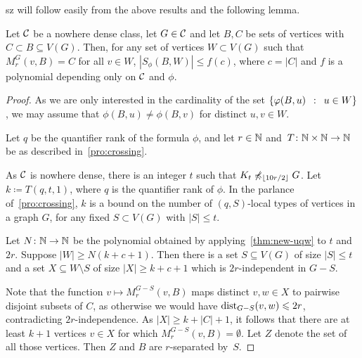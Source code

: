 \begin{change}{sz}
	 will follow easily from the above results and the following lemma.
\begin{lemma}\label{lem:num-types-same-class}
 Let $\mathcal{C}$ be a nowhere dense class,
let $G\in\mathcal{C}$ and let $B,C$ be sets of vertices with
$C\subset B\subseteq V(G)$.
Then, for any set of vertices $W\subset V(G)$ such that 
$M_r^G(v,B)=C$ for all $v\in W$, 
 $|S_\phi(B,W)|\le f(c)$, where $c=|C|$ and $f$ is a polynomial depending only on $\mathcal{C}$ and $\phi$.
\end{lemma}

\begin{proof}
As we are only interested in the cardinality of the set $\left\{\varphi(B,u) \,~:~\, u\in W \right\}$,
we may assume  that $\phi(B,u)\neq \phi(B,v)$ 
for distinct $u, v\in W$.


Let $q$ be the quantifier rank of the formula $\phi$,
and let $r\in \mathbb{N}$ and~$T\colon \mathbb{N}\times \mathbb{N}\to \mathbb{N}$  
be as described in~\cref{pro:crossing}.

As $\mathcal{C}$ is nowhere dense, there is an integer $t$ such that 
$K_t\not\preccurlyeq_{\lfloor 10r/2\rfloor} G$. 
Let $k\coloneqq T(q,t,1)$, where $q$ is the quantifier rank of $\phi$. In the parlance of~\cref{pro:crossing},
$k$ is a bound on the number of $(q,S)$-local types of vertices in a graph $G$,
for any fixed $S\subset V(G)$ with $|S|\le t$.



Let  $N\colon \mathbb{N}\to \mathbb{N}$ be the polynomial obtained by applying~\cref{thm:new-uqw} to $t$ and $2r$.
Suppose   $|W|\geq N(k+c+1)$. Then there is a  
set $S\subseteq V(G)$ of size $|S|\leq t$ 
and a set $X\subseteq W\setminus S$ of size $|X|\geq k+c+1$ which is 
$2r$-independent in $G-S$. 

Note that the function
 $v\mapsto M_r^{G-S}(v,B)$ 
 maps distinct $v,w\in X$ to pairwise disjoint subsets of $C$,
as otherwise we would have $\mathrm{dist}_{G-S}(v,w)\leqslant 2r$,
contradicting $2r$-independence.
As  $|X|\ge k+|C|+1$, it follows that 
there are at least $k+1$ vertices $v\in X$
for which ${M_r^{G-S}(v,B)=\emptyset}$. Let $Z$ denote the set of all those vertices. Then $Z$ and $B$ are $r$-separated by~$S$.



\end{proof}
\end{change}
